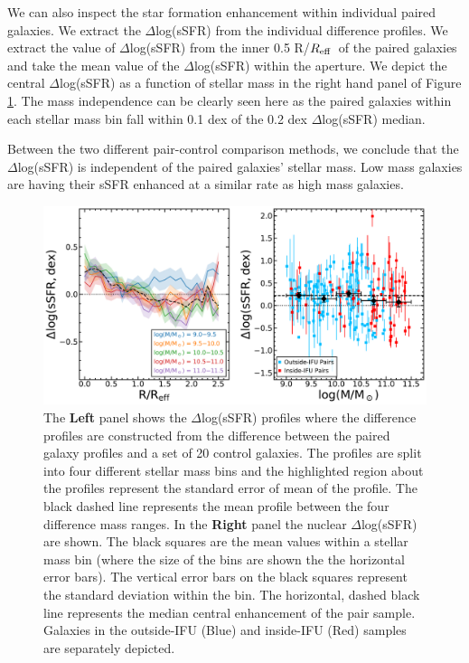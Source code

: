 \documentclass[iop,revtex4,twocolumn,apj,numberedappendix,appendixfloats]{emulateapj}
\newcommand{\reff}{$R_{\rm eff}$}
\begin{document}
We can also inspect the star formation enhancement within individual paired galaxies. We extract the $\Delta$log(sSFR) from the individual difference profiles. We extract the value of $\Delta$log(sSFR) from the inner 0.5 R/\reff\ of the paired galaxies and take the mean value of the $\Delta$log(sSFR) within the aperture. We depict the central $\Delta$log(sSFR) as a function of stellar mass in the right hand panel of Figure \ref{fig:ssfr_mass}. The mass independence can be clearly seen here as the paired galaxies within each stellar mass bin fall within 0.1 dex of the 0.2 dex $\Delta$log(sSFR) median. 

Between the two different pair-control comparison methods, we conclude that the $\Delta$log(sSFR) is independent of the paired galaxies' stellar mass. Low mass galaxies are having their sSFR enhanced at a similar rate as high mass galaxies. 

\begin{figure}
\centering
\includegraphics[width=\linewidth]{fig/ssfr_mass.pdf}
\caption[]{The \textbf{Left} panel shows the $\Delta$log(sSFR) profiles where the difference profiles are constructed from the difference between the paired galaxy profiles and a set of 20 control galaxies. The profiles are split into four different stellar mass bins and the highlighted region about the profiles represent the standard error of mean of the profile. The black dashed line represents the mean profile between the four difference mass ranges. In the \textbf{Right} panel the nuclear $\Delta$log(sSFR) are shown. The black squares are the mean values within a stellar mass bin (where the size of the bins are shown the the horizontal error bars). The vertical error bars on the black squares represent the standard deviation within the bin. The horizontal, dashed black line represents the median central enhancement of the pair sample. Galaxies in the outside-IFU (Blue) and inside-IFU (Red) samples are separately depicted.}
\label{fig:ssfr_mass}
\end{figure}
\end{document}
